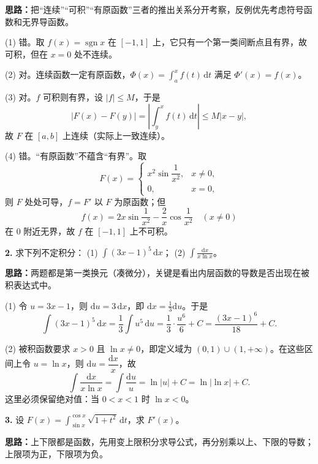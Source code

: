 \ifshowsolutions%
\textbf{思路：}把“连续”“可积”“有原函数”三者的推出关系分开考察，反例优先考虑符号函数和无界导函数。

(1) 错。取 $f(x)=\operatorname{sgn}x$ 在 $[-1,1]$ 上，它只有一个第一类间断点且有界，故可积，但在 $x=0$ 处不连续。

(2) 对。连续函数一定有原函数，$\Phi(x)=\int_a^x f(t)\,\mathrm dt$ 满足 $\Phi'(x)=f(x)$。

(3) 对。$f$ 可积则有界，设 $|f|\le M$，于是
\[
  |F(x)-F(y)|=\left|\int_y^x f(t)\,\mathrm dt\right|\le M|x-y|,
\]
故 $F$ 在 $[a,b]$ 上连续（实际上一致连续）。

(4) 错。“有原函数”不蕴含“有界”。取
\[
  F(x)=\begin{cases}x^2\sin\dfrac{1}{x^2},&x\ne 0,\\[4pt] 0,&x=0,\end{cases}
\]
则 $F$ 处处可导，$f=F'$ 以 $F$ 为原函数；但
\[
  f(x)=2x\sin\frac{1}{x^2}-\frac{2}{x}\cos\frac{1}{x^2}\quad(x\ne 0)
\]
在 $0$ 附近无界，故 $f$ 在 $[-1,1]$ 上不可积。

\else \answerarea[8] \fi%

\textbf{2.} 求下列不定积分：
(1) $\displaystyle\int (3x-1)^5\,\mathrm dx$；\qquad
(2) $\displaystyle\int \frac{\mathrm dx}{x\ln x}$。

\ifshowsolutions%
\textbf{思路：}两题都是第一类换元（凑微分），关键是看出内层函数的导数是否出现在被积表达式中。

(1) 令 $u=3x-1$，则 $\mathrm du=3\,\mathrm dx$，即 $\mathrm dx=\frac13\mathrm du$。于是
\[
  \int (3x-1)^5\,\mathrm dx=\frac13\int u^5\,\mathrm du
  =\frac13\cdot\frac{u^6}{6}+C=\frac{(3x-1)^6}{18}+C.
\]

(2) 被积函数要求 $x>0$ 且 $\ln x\ne 0$，即定义域为 $(0,1)\cup(1,+\infty)$。在这些区间上令 $u=\ln x$，则 $\mathrm du=\dfrac{\mathrm dx}{x}$，故
\[
  \int\frac{\mathrm dx}{x\ln x}=\int\frac{\mathrm du}{u}=\ln|u|+C=\ln|\ln x|+C.
\]
这里必须保留绝对值：当 $0<x<1$ 时 $\ln x<0$。

\else \answerarea[8] \fi%

\textbf{3.} 设 $F(x)=\displaystyle\int_{\sin x}^{\cos x}\sqrt{1+t^2}\,\mathrm dt$，求 $F'(x)$。

\ifshowsolutions%
\textbf{思路：}上下限都是函数，先用变上限积分求导公式，再分别乘以上、下限的导数；上限项为正，下限项为负。

